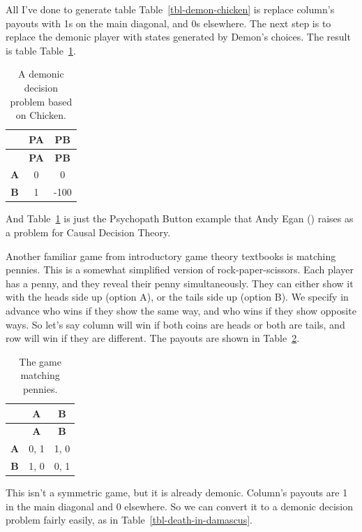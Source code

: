 \documentclass[
  12pt,
  letterpaper,
  DIV=11,
  numbers=noendperiod]{scrreprt}
\begin{document}
All I've done to generate table Table~\ref{tbl-demon-chicken} is replace
column's payouts with 1s on the main diagonal, and 0s elsewhere. The
next step is to replace the demonic player with states generated by
Demon's choices. The result is table Table~\ref{tbl-egan-game}.

\begin{longtable}[]{@{}ccc@{}}
\caption{A demonic decision problem based on
Chicken.}\label{tbl-egan-game}\tabularnewline
\toprule\noalign{}
& \textbf{PA} & \textbf{PB} \\
\midrule\noalign{}
\endfirsthead
\toprule\noalign{}
& \textbf{PA} & \textbf{PB} \\
\midrule\noalign{}
\endhead
\bottomrule\noalign{}
\endlastfoot
\textbf{A} & 0 & 0 \\
\textbf{B} & 1 & -100 \\
\end{longtable}

And Table~\ref{tbl-egan-game} is just the Psychopath Button example that
Andy Egan () raises as a problem for Causal
Decision Theory.

Another familiar game from introductory game theory textbooks is
matching pennies. This is a somewhat simplified version of
rock-paper-scissors. Each player has a penny, and they reveal their
penny simultaneously. They can either show it with the heads side up
(option A), or the tails side up (option B). We specify in advance who
wins if they show the same way, and who wins if they show opposite ways.
So let's say column will win if both coins are heads or both are tails,
and row will win if they are different. The payouts are shown in
Table~\ref{tbl-match-pennies}.

\begin{longtable}[]{@{}ccc@{}}
\caption{The game matching
pennies.}\label{tbl-match-pennies}\tabularnewline
\toprule\noalign{}
& \textbf{A} & \textbf{B} \\
\midrule\noalign{}
\endfirsthead
\toprule\noalign{}
& \textbf{A} & \textbf{B} \\
\midrule\noalign{}
\endhead
\bottomrule\noalign{}
\endlastfoot
\textbf{A} & 0, 1 & 1, 0 \\
\textbf{B} & 1, 0 & 0, 1 \\
\end{longtable}

This isn't a symmetric game, but it is already demonic. Column's payouts
are 1 in the main diagonal and 0 elsewhere. So we can convert it to a
demonic decision problem fairly easily, as in
Table~\ref{tbl-death-in-damascus}.
\end{document}
